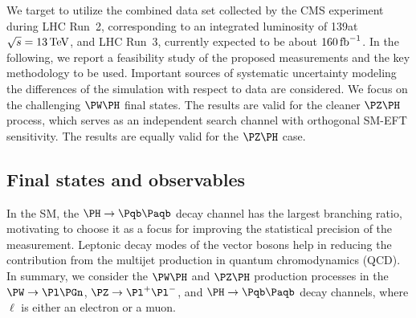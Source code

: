 \documentclass[a4paper,11pt]{article}
\newcommand{\Pb}{{{\Pqb}}\xspace}
\newcommand{\PAb}{{{{\Paqb}}}\xspace}
\begin{document}
We target to utilize the combined data set collected by the CMS experiment during LHC Run~2, corresponding to an integrated luminosity of 139\fbinv at $\sqrt{s}=13\,\text{Te\hspace{-.08em}V}$, and LHC Run~3, currently expected to be about $160\mbox{\ensuremath{\,\text{fb}^{-1}}}$.
In the following, we report 
a feasibility study of the proposed measurements and the key methodology to be used.
Important sources of systematic uncertainty modeling the differences of the simulation with respect to data are considered. 
We focus on the challenging $\PW\PH$ final states. The results are valid for the cleaner $\PZ\PH$ process, which serves as an independent search channel with orthogonal SM-EFT sensitivity.
The results are equally valid for the $\PZ\PH$ case.

\subsection{Final states and observables}

In the SM, the $\PH\rightarrow\Pb \PAb$ decay channel has the largest branching ratio, motivating to choose it as a focus for improving  the statistical precision of the measurement.
Leptonic decay modes of the vector bosons help in reducing 
the contribution
from the multijet production in quantum chromodynamics (QCD).
In summary, we consider the $\PW\PH$ and $\PZ\PH$ production processes in the $\PW\rightarrow\Pl\Pgn$, $\PZ\rightarrow{\Pl}^{+} {\Pl}^{-}$, and $\PH\rightarrow\Pb\PAb $ decay channels, where $\ell$ is either an electron or a muon.

\end{document}

